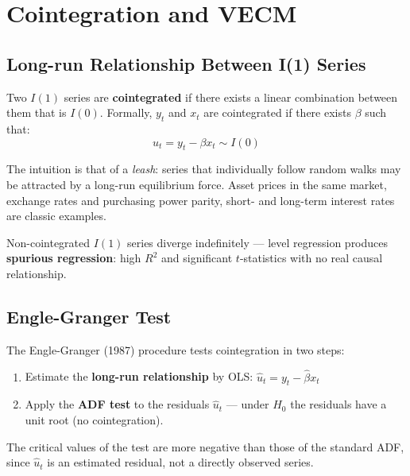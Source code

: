 \chapter{Cointegration and VECM}
\label{cap:coint}

\section{Long-run Relationship Between I(1) Series}

Two $I(1)$ series are \textbf{cointegrated} if there exists a linear combination
between them that is $I(0)$. Formally, $y_t$ and $x_t$ are cointegrated if
there exists $\beta$ such that:
\[
  u_t = y_t - \beta x_t \sim I(0)
\]

The intuition is that of a \emph{leash}: series that individually follow
random walks may be attracted by a long-run equilibrium force. Asset prices
in the same market, exchange rates and purchasing power parity, short- and
long-term interest rates are classic examples.

Non-cointegrated $I(1)$ series diverge indefinitely — level regression produces
\textbf{spurious regression}: high $R^2$ and significant $t$-statistics with
no real causal relationship.

\section{Engle-Granger Test}

The Engle-Granger (1987) procedure tests cointegration in two steps:

\begin{enumerate}
  \item Estimate the \textbf{long-run relationship} by OLS:
        $\hat u_t = y_t - \hat\beta x_t$
  \item Apply the \textbf{ADF test} to the residuals $\hat u_t$ — under $H_0$
        the residuals have a unit root (no cointegration).
\end{enumerate}

The critical values of the test are more negative than those of the standard ADF,
since $\hat u_t$ is an estimated residual, not a directly observed series.

